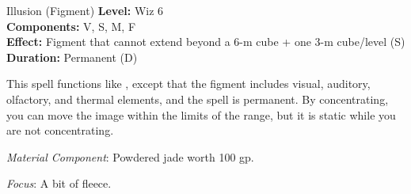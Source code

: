 {Illusion (Figment)}
{
	\textbf{Level:}
	Wiz 6\\
	\textbf{Components:}
	V, S, M, F\\
	\textbf{Effect:}
	Figment that cannot extend beyond a 6-m cube + one 3-m cube/level (S)\\
	\textbf{Duration:}
	Permanent (D)\\
}
{
	This spell functions like , except that the figment includes visual, auditory, olfactory, and thermal elements, and the spell is permanent. By concentrating, you can move the image within the limits of the range, but it is static while you are not concentrating.

	\textit{Material Component}:
	 Powdered jade worth 100 gp.

	\textit{Focus}:
	A bit of fleece.

}

